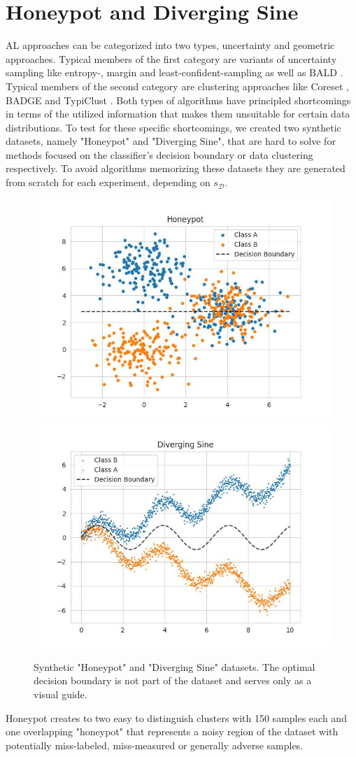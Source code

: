 \documentclass[]{article}
\newcommand{\D}{\mathcal{D}}
\begin{document}
\section{Honeypot and Diverging Sine}
AL approaches can be categorized into two types, uncertainty and geometric approaches.
Typical members of the first category are variants of uncertainty sampling like entropy-, margin and least-confident-sampling \cite{wang2014new} as well as BALD \cite{gal2017deep}.
Typical members of the second category are clustering approaches like Coreset \cite{sener2017active}, BADGE \cite{ashdeep} and TypiClust \cite{hacohen2022active}.
Both types of algorithms have principled shortcomings in terms of the utilized information that makes them unsuitable for certain data distributions. 
To test for these specific shortcomings, we created two synthetic datasets, namely "Honeypot" and "Diverging Sine", that are hard to solve for methods focused on the classifier's decision boundary or data clustering respectively. 
To avoid algorithms memorizing these datasets they are generated from scratch for each experiment, depending on $s_\D$. \\
\begin{figure}[]
	\centering
	\includegraphics[width=0.4\linewidth]{img/honeypot.jpg}
	\includegraphics[width=0.4\linewidth]{img/diverging_sin.jpg}
	\caption{Synthetic "Honeypot" and "Diverging Sine" datasets. The optimal decision boundary is not part of the dataset and serves only as a visual guide.}
	\label{fig:synthDataAppendix}
\end{figure}
%
Honeypot creates to two easy to distinguish clusters with 150 samples each and one overlapping "honeypot" that represents a noisy region of the dataset with potentially miss-labeled, miss-measured or generally adverse samples.
\end{document}
